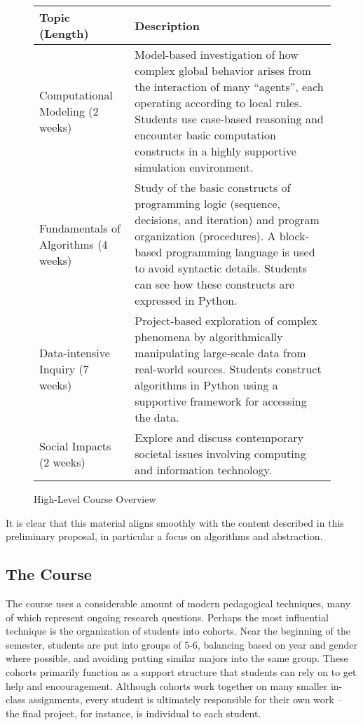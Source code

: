 \begin{figure*}
\begin{tabularx}{\textwidth}{ |l|X| }
\hline
Topic (Length) &	Description \\\hline
Computational Modeling \newline\newline
 (2 weeks) & Model-based investigation of how complex global behavior arises from the interaction of many “agents”, each operating according to local rules. Students use case-based reasoning and encounter basic computation constructs in a highly supportive simulation environment. \\\hline
Fundamentals of Algorithms \newline (4 weeks) & Study of the basic constructs of programming logic (sequence, decisions, and iteration) and program organization (procedures). A block-based programming language is used to avoid syntactic details. Students can see how these constructs are expressed in Python. \\\hline
Data-intensive Inquiry \newline (7 weeks) & Project-based exploration of complex phenomena by algorithmically manipulating large-scale data from real-world sources. Students construct algorithms in Python using a supportive framework for accessing the data. \\\hline
Social Impacts \newline (2 weeks) & Explore and discuss contemporary societal issues involving computing and information technology. \\\hline
\end{tabularx}
\caption{High-Level Course Overview}
\label{course-outline}
\end{figure*}

It is clear that this material aligns smoothly with the content described in this preliminary proposal, in particular a focus on algorithms and abstraction.

\subsection{The Course}

The course uses a considerable amount of modern pedagogical techniques, many of which represent ongoing research questions.
Perhaps the most influential technique is the organization of students into cohorts.
Near the beginning of the semester, students are put into groups of 5-6, balancing based on year and gender where possible, and avoiding putting similar majors into the same group.
These cohorts primarily function as a support structure that students can rely on to get help and encouragement.
Although cohorts work together on many smaller in-class assignments, every student is ultimately responsible for their own work -- the final project, for instance, is individual to each student.

